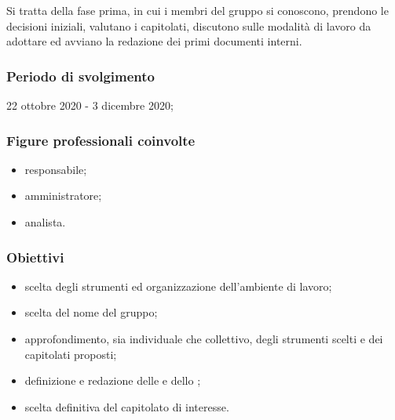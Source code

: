 Si tratta della fase prima, in cui i membri del gruppo si conoscono, prendono le decisioni iniziali, valutano i capitolati, discutono sulle modalità di lavoro da adottare ed avviano la redazione dei primi documenti interni.
        
        \subsubsection{Periodo di svolgimento}
        22 ottobre 2020 - 3 dicembre 2020;
        
        \subsubsection{Figure professionali coinvolte}
            \begin{itemize}
                \item responsabile;
                \item amministratore;
                \item analista.
            \end{itemize}
        
        \subsubsection{Obiettivi}
            \begin{itemize}
                \item scelta degli strumenti ed organizzazione dell'ambiente di lavoro;
                \item scelta del nome del gruppo;
                \item approfondimento, sia individuale che collettivo, degli strumenti scelti e dei capitolati proposti;
                \item definizione e redazione delle \NdP{} e dello \SdF{};
                \item scelta definitiva del capitolato di interesse.
            \end{itemize}